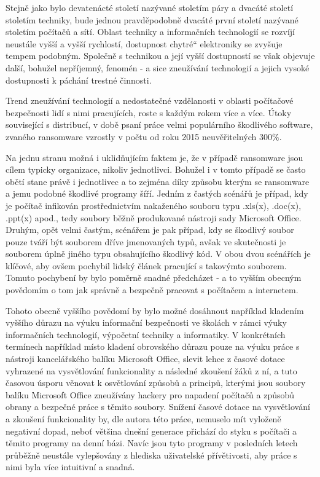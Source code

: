 \documentclass[a4paper, 12pt]{article}
\providecommand{\uv}[1]{\quotedblbase #1\textquotedblleft}
\begin{document}



Stejně jako bylo devatenácté století nazývané stoletím páry a dvacáté století stoletím techniky, bude jednou pravděpodobně dvacáté první století nazývané stoletím počítačů a sítí. Oblast techniky a informačních technologií se rozvíjí neustále vyšší a vyšší rychlostí, dostupnost \uv{chytré} elektroniky se zvyšuje tempem podobným. Společně s technikou a její vyšší dostupností se však objevuje další, bohužel nepříjemný, fenomén \-- a sice zneužívání technologií a jejich vysoké dostupnosti k páchání trestné činnosti. 

Trend zneužívání technologií a nedostatečné vzdělanosti v oblasti počítačové bezpečnosti lidí s nimi pracujících, roste s každým rokem více a více. Útoky související s distribucí, v době psaní práce velmi populárního škodlivého software, zvaného ransomware vzrostly v počtu od roku 2015 neuvěřitelných 300$\%$.

Na jednu stranu možná i uklidňujícím faktem je, že v případě ransomware jsou cílem typicky organizace, nikoliv jednotlivci. Bohužel i v tomto případě se často obětí stane právě i jednotlivec a to zejména díky způsobu kterým se ransomware a jemu podobné škodlivé programy šíří. Jedním z častých scénářů je případ, kdy je počítač infikován prostřednictvím nakaženého souboru typu .xls(x), .doc(x), .ppt(x) apod., tedy soubory běžně produkované nástroji sady Microsoft Office. Druhým, opět velmi častým, scénářem je pak případ, kdy se škodlivý soubor pouze tváří být souborem dříve jmenovaných typů, avšak ve skutečnosti je souborem úplně jiného typu obsahujícího škodlivý kód. V obou dvou scénářích je klíčové, aby ovšem pochybil lidský článek pracující s takovýmto souborem. Tomuto pochybení by bylo poměrně snadné předcházet - a to vyšším obecným povědomím o tom jak správně a bezpečně pracovat s počítačem a internetem. 

Tohoto obecně vyššího povědomí by bylo možné dosáhnout například kladením vyššího důrazu na výuku informační bezpečnosti ve školách v rámci výuky informačních technologií, výpočetní techniky a informatiky. V konkrétních termínech například místo kladení obrovského důrazu pouze na výuku práce s nástroji kancelářského balíku Microsoft Office, slevit lehce z časové dotace vyhrazené na vysvětlování funkcionality a následné zkoušení žáků z ní, a tuto časovou úsporu věnovat k osvětlování způsobů a principů, kterými jsou soubory balíku Microsoft Office zneužívány hackery pro napadení počítačů a způsobů obrany a bezpečné práce s těmito soubory. Snížení časové dotace na vysvětlování a zkoušení funkcionality by, dle autora této práce, nemuselo mít vyloženě negativní dopad, neboť většina dnešní generace přichází do styku s počítači a těmito programy na denní bázi. Navíc jsou tyto programy v posledních letech průběžně neustále vylepšovány z hlediska uživatelské přívětivosti, aby práce s nimi byla více intuitivní a snadná. 
\end{document}
